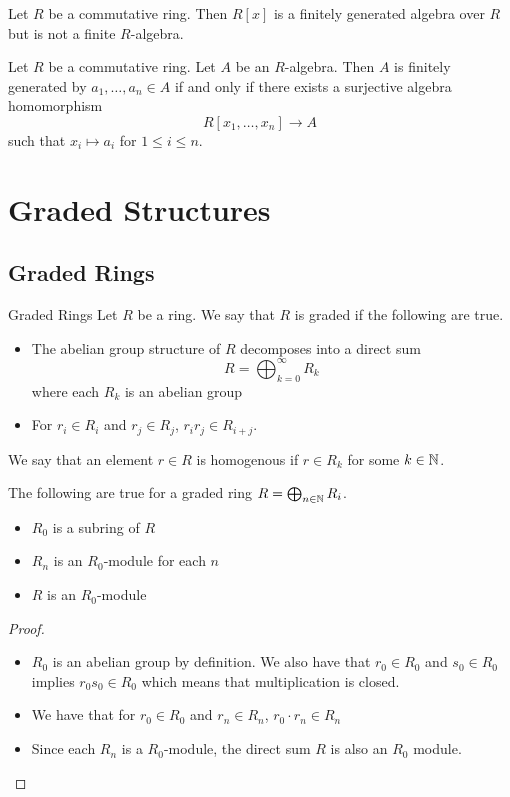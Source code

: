 \documentclass[a4paper]{article}
\begin{document}
\begin{eg}{}{} Let $R$ be a commutative ring. Then $R[x]$ is a finitely generated algebra over $R$ but is not a finite $R$-algebra. 
\end{eg}

\begin{lmm}{}{} Let $R$ be a commutative ring. Let $A$ be an $R$-algebra. Then $A$ is finitely generated by $a_1,\dots,a_n\in A$ if and only if there exists a surjective algebra homomorphism $$R[x_1,\dots,x_n]\to A$$ such that $x_i\mapsto a_i$ for $1\leq i\leq n$. 
\end{lmm}

\pagebreak
\section{Graded Structures}
\subsection{Graded Rings}
\begin{defn}{Graded Rings}{} Let $R$ be a ring. We say that $R$ is graded if the following are true. 
\begin{itemize}
\item The abelian group structure of $R$ decomposes into a direct sum $$R=\bigoplus_{k=0}^\infty R_k$$ where each $R_k$ is an abelian group 
\item For $r_i\in R_i$ and $r_j\in R_j$, $r_ir_j\in R_{i+j}$. 
\end{itemize}
We say that an element $r\in R$ is homogenous if $r\in R_k$ for some $k\in\mathbb{N}$. 
\end{defn}

\begin{prp}{}{} The following are true for a graded ring $R=\bigoplus_{n\in\mathbb{N}}R_i$. 
\begin{itemize}
\item $R_0$ is a subring of $R$
\item $R_n$ is an $R_0$-module for each $n$
\item $R$ is an $R_0$-module
\end{itemize} \tcbline
\begin{proof}~\\
\begin{itemize}
\item $R_0$ is an abelian group by definition. We also have that $r_0\in R_0$ and $s_0\in R_0$ implies $r_0s_0\in R_0$ which means that multiplication is closed. 
\item We have that for $r_0\in R_0$ and $r_n\in R_n$, $r_0\cdot r_n\in R_n$
\item Since each $R_n$ is a $R_0$-module, the direct sum $R$ is also an $R_0$ module. 
\end{itemize}
\end{proof}
\end{prp}
\end{document}
